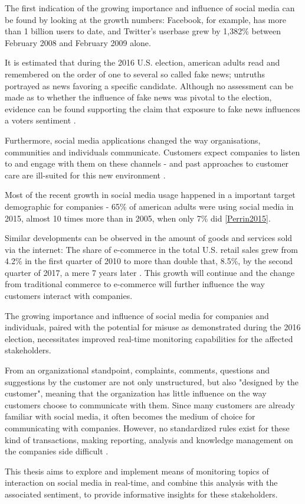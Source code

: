 The first indication of the growing importance and influence of social media can be found by looking at the growth numbers:
Facebook, for example, has more than 1 billion users to date, and Twitter's userbase grew by 1,382\% between February 2008 and February 2009 \cite{mcgiboney2009twitter} alone.
\par

It is estimated that during the 2016 U.S. election, american adults read and remembered on the order of one to several so called fake news;
untruths portrayed as news favoring a specific candidate.
Although no assessment can be made as to whether the influence of fake news was pivotal to the election,
evidence can be found supporting the claim that exposure to fake news influences a voters sentiment \cite{Allcott2017}.
\par
Furthermore, social media applications changed the way organisations, communities and individuals communicate.
Customers expect companies to listen to and engage with them on these channels - and past approaches to customer care are ill-suited for this new environment \cite{Kietzmann2011}.
\par
Most of the recent growth in social media usage happened in a important target demographic for companies -
65\% of american adults were using social media in 2015, almost 10 times more than in 2005, when only 7\% did \ref{Perrin2015}.
\par
Similar developments can be observed in the amount of goods and services sold via the internet:
The share of e-commerce in the total U.S. retail sales grew from 4.2\% in the first quarter of 2010 to more than double that, 8.5\%, by the second quarter of 2017, a mere 7 years later \cite{statistaECommerceGrowth}.
This growth will continue and the change from traditional commerce to e-commerce
will further influence the way customers interact with companies.
\par
The growing importance and influence of social media for companies and individuals,
paired with the potential for misuse as demonstrated during the 2016 election,
necessitates improved real-time monitoring capabilities for the affected stakeholders.
\par
From an organizational standpoint, complaints, comments, questions and suggestions by the customer are not only unstructured,
but also "designed by the customer", meaning that the organization has little influence on the way customers choose to communicate with them.
Since many customers are already familiar with social media, it often becomes the medium of choice for communicating with companies.
However, no standardized rules exist for these kind of transactions, making reporting, analysis and knowledge management on the companies side difficult \cite{Culnan2015}.
\par
This thesis aims to explore and implement means of monitoring topics of interaction on social media in real-time,
and combine this analysis with the associated sentiment, to provide informative insights for these stakeholders.


